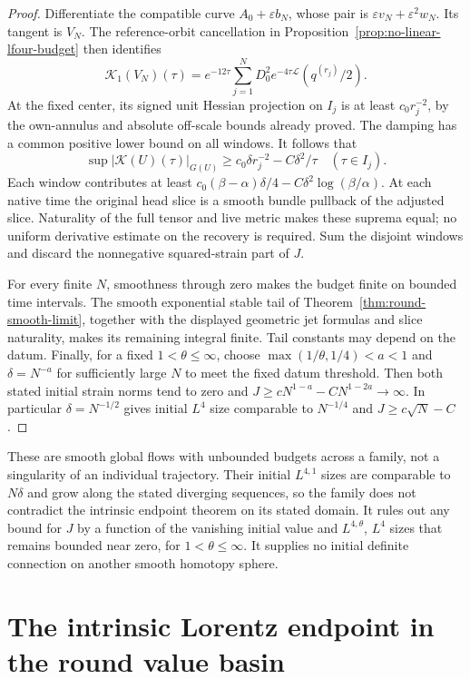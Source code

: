 \documentclass[11pt]{article}
\numberwithin{equation}{section}
\theoremstyle{definition}
\theoremstyle{remark}
\begin{document}
\begin{proof}
Differentiate the compatible curve \(A_0+\varepsilon b_N\),
whose pair is \(\varepsilon v_N+\varepsilon^2w_N\).
Its tangent is \(V_N\). The reference-orbit cancellation
in Proposition~\ref{prop:no-linear-lfour-budget} then identifies
\[
 \mathcal K_1(V_N)(\tau)
 =e^{-12\tau}\sum_{j=1}^N
       D_0^2e^{-4\tau\mathcal L}(q^{(r_j)}/2).
\]
At the fixed center, its signed unit Hessian projection
on \(I_j\) is at least \(c_0r_j^{-2}\), by the
own-annulus and absolute off-scale bounds already proved.
The damping has a common positive lower bound on all
windows. It follows that
\[
 \sup|\mathcal K(U)(\tau)|_{G(U)}
       \ge c_0\delta r_j^{-2}-C\delta^2/\tau
                 \quad(\tau\in I_j).
\]
Each window contributes at least
\(c_0(\beta-\alpha)\delta/4
 -C\delta^2\log(\beta/\alpha)\).
At each native time the original head slice is a smooth
bundle pullback of the adjusted slice. Naturality of the
full tensor and live metric makes these suprema equal;
no uniform derivative estimate on the recovery is required.
Sum the disjoint windows and discard the nonnegative
squared-strain part of \(J\).

For every finite \(N\), smoothness through zero makes
the budget finite on bounded time intervals.
The smooth exponential stable tail of
Theorem~\ref{thm:round-smooth-limit}, together with the
displayed geometric jet formulas and slice naturality,
makes its remaining integral finite. Tail constants
may depend on the datum. Finally, for a fixed
\(1<\theta\le\infty\), choose
\(\max(1/\theta,1/4)<a<1\) and \(\delta=N^{-a}\)
for sufficiently large \(N\) to meet the fixed datum threshold.
Then both stated initial strain norms tend to zero and
\(J\ge cN^{1-a}-CN^{1-2a}\to\infty\).
In particular \(\delta=N^{-1/2}\) gives initial
\(L^4\) size comparable to \(N^{-1/4}\) and
\(J\ge c\sqrt N-C\).
\end{proof}

These are smooth global flows with unbounded budgets across
a family, not a singularity of an individual trajectory.
Their initial \(L^{4,1}\) sizes are comparable to \(N\delta\)
and grow along the stated diverging sequences,
so the family does not contradict the intrinsic endpoint
theorem on its stated domain. It rules out any bound for
\(J\) by a function of the vanishing initial value and
\(L^{4,\theta}\), \(L^4\) sizes that remains bounded near
zero, for \(1<\theta\le\infty\). It supplies no initial
definite connection on another smooth homotopy sphere.



\section{The intrinsic Lorentz endpoint in the round value basin}
\label{sec:intrinsic-value-endpoint}
\end{document}
